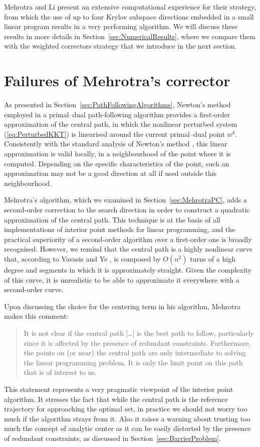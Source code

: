Mehrotra and Li \cite{MehrotraLi} present an extensive 
computational experience for their strategy, from which 
the use of up to four Krylov subspace directions embedded in a small
linear program results in a very performing algorithm.
We will discuss these results in more details in 
Section~\ref{sec:NumericalResults}, where we compare them with
the weighted correctors strategy that we introduce in the
next section.


%
%
\section{Failures of Mehrotra's corrector}

As presented in Section~\ref{sec:PathFollowingAlgorithms},
Newton's method employed in a primal--dual path-following algorithm
provides a first-order approximation of the central path, in which
the nonlinear perturbed \KKT system (\ref{eq:PerturbedKKT}) 
is linearised around the current primal--dual point $w^k$. Consistently with 
the standard analysis of Newton's method \cite{Fletcher},
this linear approximation 
is valid locally, in a neighbourhood of the point where 
it is computed. Depending on the specific characteristics of the point, 
such an approximation may not be a good direction at all 
if used outside this neighbourhood.

Mehrotra's algorithm, which we examined in 
Section~\ref{sec:MehrotraPC}, adds a second-order correction to the search 
direction in order to construct a quadratic approximation 
of the central path. This technique is at the basis of all
implementations of interior point methods for linear programming,
and the practical superiority of a second-order algorithm over 
a first-order one is broadly recognised.
However, we remind that 
the central path is a highly nonlinear curve that, according 
to Vavasis and Ye \cite{VavasisYe}, is composed by $O(n^2)$ turns 
of a high degree and segments in which it is approximately straight. 
Given the complexity of this curve, it is unrealistic to be able 
to approximate it everywhere with a second-order curve.

Upon discussing the choice for the centering term in his algorithm,
Mehrotra \cite{Mehrotra92} makes this comment:
\begin{quotation}
It is not clear if the central path [\ldots]
is the best path to follow, particularly since it
is affected by the presence of redundant constraints. Furthermore,
the points on (or near) the central path are only intermediate to
solving the linear programming problem. It is only the limit point 
on this path that is of interest to us.
\end{quotation}
This statement represents a very pragmatic viewpoint of the interior
point algorithm. It stresses the fact that while the central path
is the reference trajectory for approaching the optimal set,
in practice we should not worry too much if the algorithm strays from it.
Also it raises a warning about trusting too much the concept
of analytic center as it can be easily distorted by the presence
of redundant constraints, as discussed in Section~\ref{sec:BarrierProblem}.

